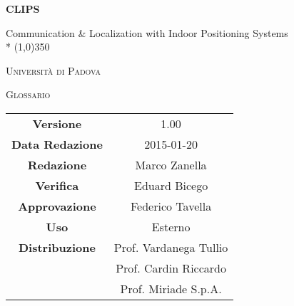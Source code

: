 \documentclass[a4paper]{article}
\author{Zanella Marco}
\date{07/12/2015}
\begin{document}
\begin{titlepage}
	\centering
	{\huge\bfseries CLIPS\par}
	Communication \& Localization with Indoor Positioning Systems \\*
	\line(1,0){350} \\
	{\scshape\LARGE Università di Padova \par}
	\vspace{1cm}
	{\scshape\Large Glossario \par}
	\logo
	\newpage
		\begin{tabular}{c|c}
			{\hfill \textbf{Versione}} 			& 1.00			\\[1ex]
			{\hfill\textbf{Data Redazione}} 	& 2015-01-20  \\[1ex]
			{\hfill\textbf{Redazione}} 			&  Marco Zanella      \\[1ex]
			{\hfill\textbf{Verifica}} 			&  Eduard Bicego	\\[1ex]
			{\hfill\textbf{Approvazione}} 		&  Federico Tavella	\\[1ex] 
			{\hfill\textbf{Uso}} 				& Esterno		\\[1ex]
			{\hfill\textbf{Distribuzione}} 		& Prof. Vardanega Tullio	\\[1ex]
                                                    & Prof. Cardin Riccardo	\\[1ex]
                                                    & Prof. Miriade S.p.A.	\\[1ex]
		\end{tabular}
	\end{titlepage}
	

	
	\pagestyle{mymain}
	\glsaddall
	\printglossary[style=myaltlistgroup, nonumberlist]

\label{LastPage}
\end{document}
